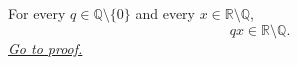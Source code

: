 \begin{lemma}
\label{lem:nonzero-rational-product-preserves-irrationality}
For every $q\in\mathbb{Q}\setminus\{0\}$ and every
$x\in\mathbb{R}\setminus\mathbb{Q}$,
\[
  qx\in\mathbb{R}\setminus\mathbb{Q}.
\]
\hyperref[prf:nonzero-rational-product-preserves-irrationality]{\textit{Go to proof.}}
\end{lemma}